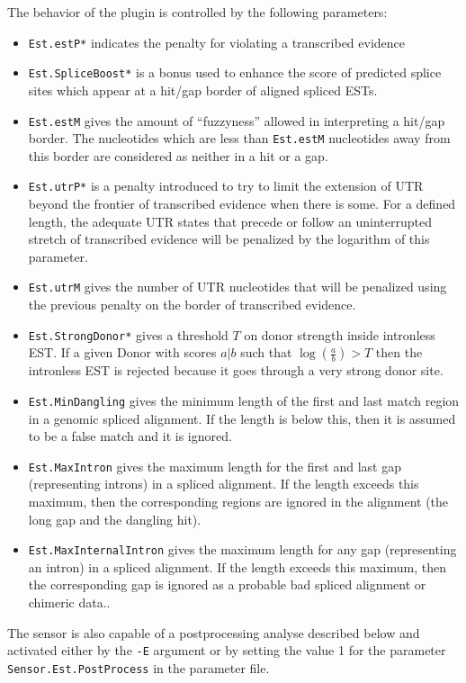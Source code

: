The behavior of the plugin is controlled by the following parameters:
\begin{itemize}
\item \texttt{Est.estP*} indicates the penalty for violating a transcribed
  evidence
\item \texttt{Est.SpliceBoost*} is a bonus used to enhance the score 
  of predicted splice sites which appear at a hit/gap border of aligned 
  spliced ESTs.
\item \texttt{Est.estM} gives the amount of ``fuzzyness'' allowed in
  interpreting a hit/gap border. The nucleotides which are less than
  \texttt{Est.estM} nucleotides away from this border are considered
  as neither in a hit or a gap.
\item \texttt{Est.utrP*} is a penalty introduced to try to limit the
  extension of UTR beyond the frontier of transcribed evidence when
  there is some. For a defined length, the adequate UTR states that
  precede or follow an uninterrupted stretch of transcribed evidence
  will be penalized by the logarithm of this parameter.
\item \texttt{Est.utrM} gives the number of UTR nucleotides that will
  be penalized using the previous penalty on the border of transcribed
  evidence.
\item \texttt{Est.StrongDonor*} gives a threshold $T$ on donor strength
  inside intronless EST. If a given Donor with scores $a|b$ such that
  $\log(\frac{a}{b}) >T$ then the intronless EST is rejected because
  it goes through a very strong donor site.
\item \texttt{Est.MinDangling} gives the minimum length of the first
  and last match region in a genomic spliced alignment. If the length
  is below this, then it is assumed to be a false match and it is
  ignored.
\item \texttt{Est.MaxIntron} gives the maximum length for the first
  and last gap (representing introns) in a spliced alignment. If the
  length exceeds this maximum, then the corresponding regions are
  ignored in the alignment (the long gap and the dangling hit).
\item \texttt{Est.MaxInternalIntron} gives the maximum length for any
  gap (representing an intron) in a spliced alignment. If the length
  exceeds this maximum, then the corresponding gap is ignored as
  a probable bad spliced alignment or chimeric data..
\end{itemize}

The sensor is also capable of a postprocessing analyse described below
and activated either by the \texttt{-E} argument or by setting the value
1 for the parameter \texttt{Sensor.Est.PostProcess} in the parameter
file.

